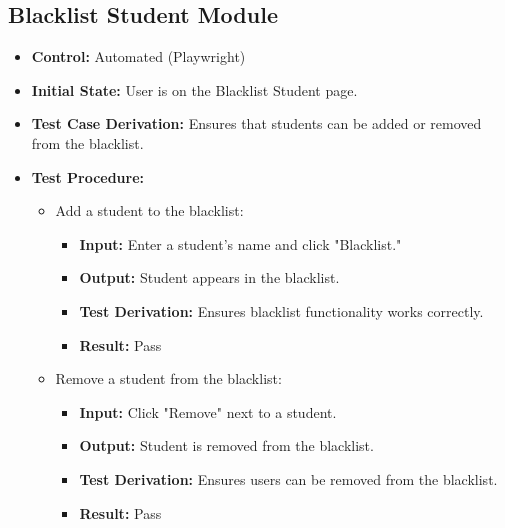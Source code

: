 \documentclass[12pt, titlepage]{article}
\begin{document}
\subsection{Blacklist Student Module}
\begin{itemize}
    \item \textbf{Control: }Automated (Playwright)
    \item \textbf{Initial State: }User is on the Blacklist Student page.
    \item \textbf{Test Case Derivation: }Ensures that students can be added or removed from the blacklist.
    \item \textbf{Test Procedure: }
    \begin{itemize}
        \item Add a student to the blacklist:
        \begin{itemize}
            \item \textbf{Input: }Enter a student's name and click "Blacklist."
            \item \textbf{Output: }Student appears in the blacklist.
            \item \textbf{Test Derivation: }Ensures blacklist functionality works correctly.
            \item \textbf{Result: }Pass
        \end{itemize}
        \item Remove a student from the blacklist:
        \begin{itemize}
            \item \textbf{Input: }Click "Remove" next to a student.
            \item \textbf{Output: }Student is removed from the blacklist.
            \item \textbf{Test Derivation: }Ensures users can be removed from the blacklist.
            \item \textbf{Result: }Pass
        \end{itemize}
    \end{itemize}
\end{itemize}
\end{document}
